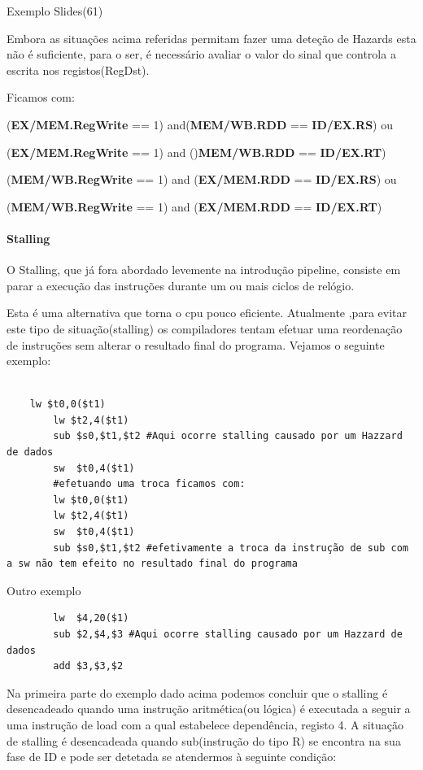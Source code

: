 \documentclass[10pt,a4paper]{book}
\begin{document}
		Exemplo Slides(61)


		Embora as situações acima referidas permitam fazer uma deteção de Hazards esta não é suficiente, para o ser, é necessário avaliar o valor do sinal que controla a escrita nos registos(RegDst).


		Ficamos com:

		(\textbf{EX/MEM.RegWrite} == 1) and(\textbf{MEM/WB.RDD} == \textbf{ID/EX.RS}) ou

		(\textbf{EX/MEM.RegWrite} == 1) and ()\textbf{MEM/WB.RDD} == \textbf{ID/EX.RT})

		(\textbf{MEM/WB.RegWrite} == 1) and (\textbf{EX/MEM.RDD} == \textbf{ID/EX.RS}) ou

		(\textbf{MEM/WB.RegWrite} == 1) and (\textbf{EX/MEM.RDD} == \textbf{ID/EX.RT})




	 \paragraph{Stalling}

	 O Stalling, que já fora abordado levemente na introdução pipeline, consiste em parar a execução das instruções durante um ou mais ciclos de relógio.


	 Esta é uma alternativa que torna o cpu pouco eficiente. Atualmente ,para evitar este tipo de situação(stalling) os compiladores tentam efetuar uma reordenação de instruções sem alterar o resultado final do programa. Vejamos o seguinte exemplo:

	 \begin{lstlisting}

    lw $t0,0($t1)
		lw $t2,4($t1)
		sub $s0,$t1,$t2 #Aqui ocorre stalling causado por um Hazzard de dados
		sw  $t0,4($t1)
 		#efetuando uma troca ficamos com:
		lw $t0,0($t1)
		lw $t2,4($t1)
		sw  $t0,4($t1)
		sub $s0,$t1,$t2 #efetivamente a troca da instrução de sub com a sw não tem efeito no resultado final do programa
	 \end{lstlisting}

	 Outro exemplo

	 \begin{lstlisting}
	 	lw  $4,20($1)
	 	sub $2,$4,$3 #Aqui ocorre stalling causado por um Hazzard de dados
	 	add $3,$3,$2
	 \end{lstlisting}

	 Na primeira parte do exemplo dado acima podemos concluir que o stalling é desencadeado quando uma instrução aritmética(ou lógica) é executada a seguir a uma instrução de load com a qual estabelece dependência, registo 4. A situação de stalling é desencadeada quando sub(instrução do tipo R) se encontra na sua fase de ID e pode ser detetada se atendermos à seguinte condição:
\end{document}
